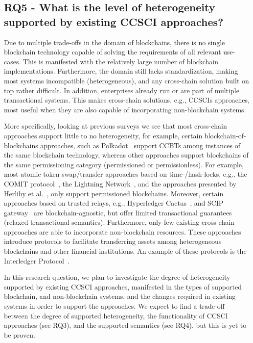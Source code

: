 \documentclass[review]{elsarticle}
\begin{document}
\subsection*{RQ5 - What is the level of heterogeneity supported by existing CCSCI approaches?}
Due to multiple trade-offs in the domain of blockchains, there is no single blockchain technology capable of solving the requirements of all relevant use-cases.
This is manifested with the relatively large number of blockchain implementations.
Furthermore, the domain still lacks standardization, making most systems incompatible (heterogeneous), and any cross-chain solution built on top rather difficult.
In addition, enterprises already run or are part of multiple transactional systems.
This makes cross-chain solutions, e.g., CCSCIs approaches, most useful when they are also capable of incorporating non-blockchain systems.

More specifically, looking at previous surveys we see that most cross-chain approaches support little to no heterogeneity, for example, certain blockchain-of-blockchains approaches, such as Polkadot~\cite{Wood2016Polkadot} support CCBTs among instances of the same blockchain technology, whereas other approaches support blockchains of the same permissioning category (permissioned or permissionless).
For example, most atomic token swap/transfer approaches based on time-/hash-locks, e.g., the COMIT protocol~\cite{CoBloX2020Comit}, the Lightning Network~\cite{Poon2015LightningNetwork}, and the approaches presented by Herlihy et al.~\cite{Herlihy2018AtomicCCSwaps}, only support permissioned blockchains.
Moreover, certain approaches based on trusted relays, e.g., Hyperledger Cactus~\cite{Montgomery2020Cactus}, and SCIP gateway~\cite{Falazi2020_SCIP} are blockchain-agnostic, but offer limited transactional guarantees (relaxed transactional semantics).
Furthermore, only few existing cross-chain approaches are able to incorporate non-blockchain resources.
These approaches introduce protocols to facilitate transferring assets among heterogeneous blockchains and other financial institutions.
An example of these protocols is the Interledger Protocol~\cite{Hope-Bailie2016Interledger}.

In this research question, we plan to investigate the degree of heterogeneity supported by existing CCSCI approaches, manifested in the types of supported blockchain, and non-blockchain systems, and the changes required in existing systems in order to support the approaches.
We expect to find a trade-off between the degree of supported heterogeneity, the functionality of CCSCI approaches (see RQ3), and the supported semantics (see RQ4), but this is yet to be proven.
\end{document}
